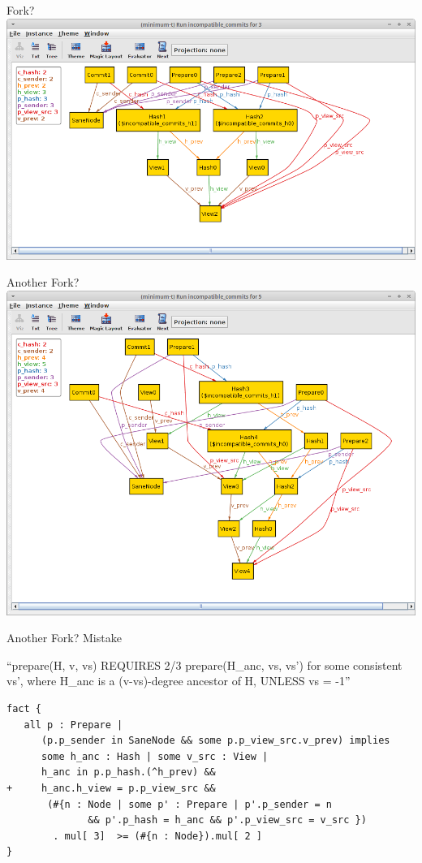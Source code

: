 \documentclass{beamer}
\begin{document}
\begin{frame}{Fork?}
\includegraphics[width=\textwidth]{fork.png}

\end{frame}

\begin{frame}{Another Fork?}
\includegraphics[width=\textwidth]{fork2.png}
\end{frame}

\begin{frame}[fragile]{Another Fork?  Mistake}

``prepare(H, v, vs) REQUIRES 2/3 prepare(H\_anc, vs, vs') for some consistent vs', \alert{where H\_anc is a (v-vs)-degree ancestor of H}, UNLESS vs = -1''

\begin{verbatim}
fact {
   all p : Prepare |
      (p.p_sender in SaneNode && some p.p_view_src.v_prev) implies
      some h_anc : Hash | some v_src : View |
      h_anc in p.p_hash.(^h_prev) &&
+     h_anc.h_view = p.p_view_src &&
       (#{n : Node | some p' : Prepare | p'.p_sender = n
              && p'.p_hash = h_anc && p'.p_view_src = v_src })
        . mul[ 3]  >= (#{n : Node}).mul[ 2 ]
}
\end{verbatim}
\end{frame}
\end{document}
